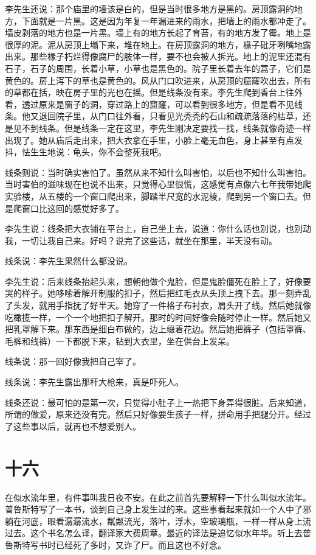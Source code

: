 李先生还说：那个庙里的墙该是白的，但是当时很多地方是黑的。房顶露洞的地方，下面就是一片黑。这是因为年复一年漏进来的雨水，把墙上的雨水都冲走了。墙皮剥落的地方也是一片黑。墙上有的地方长起了育苔，有的地方发了霉。地上是很厚的泥。泥从房顶上塌下来，堆在地上。在房顶露洞的地方，椽子砒牙咧嘴地露出来。那些椽子朽烂得像腐尸的肢体一样，要不也会被人拆光。地上的泥里还混有石子，石子的周围，长着小草，小草也是黑色的。院子里长着去年的蒿子，它们是黄色的。房上泻下的草也是黄色的。风从门口吹进来，从房顶的窟窿吹出去，所有的草都在括，映在房子里的光也在摇。但是线条没有来。李先生爬到香台上往外看，透过原来是窗子的洞，穿过路上的窟窿，可以看到很多地方，但是看不见线条。他又退回院子里，从门口往外看，只看见光秃秃的石山和疏疏落落的枯草，还是见不到线条。但是线条一定在这里，李先生刚决定要找一找，线条就像奇迹一样出现了。她从庙后走出来，把大衣拿在手里，小脸上毫无血色，身上甚至有点发抖，怯生生地说：龟头，你不会整死我吧。 

线条则说：当时确实害怕了。虽然从来不知什么叫害怕，以后也不知什么叫害怕。当时害伯的滋味现在也说不出来，只觉得心里很慌，这感觉有点像六七年我带她爬实验楼，从五楼的一个窗口爬出来，脚踏半尺宽的水泥棱，爬到另一个窗口去。但是爬窗口比这回的感觉好多了。 

李先生说：线条把大衣铺在平台上，自己坐上去，说道：你什么话也别说，也别动我，一切让我自己来。好吗？说完了这些话，就坐在那里，半天没有动。 

线条说：李先生果然什么都没说。 

李先生说：后来线条抬起头来，想朝他做个鬼脸，但是鬼脸僵死在脸上了，好像要哭的样子。她哆嗦着解开制服的扣子，然后把红毛衣从头顶上拽下去。那一刻弄乱了头发，就用手指抚了好半天。她穿了一件格子布衬衣，肩头开了线。然后她就像吃橄揽一样，一个一个地把扣子解开。那时的时间好像会随时停止一样。然后她又把乳罩解下来。那东西是细白布做的，边上缀着花边。然后她把裤子（包括罩裤、毛裤和线裤）一下都脱下来，钻到大衣里，坐在供台上发呆。 

线条说：那一回好像我把自己宰了。 

线条说：李先生露出那秆大枪来，真是吓死人。 

线条还说：最可怕的是第一次，只觉得小肚子上一热把下身弄得很脏。后来知道，所谓的做爱，原来还没有完。然后只好像要生孩子一样，拼命用手把腿分开。经过了这些事以后，就再也不想爱别人。

\section{十六}

在似水流年里，有件事叫我日夜不安。在此之前首先要解释一下什么叫似水流年。普鲁斯特写了一本书，谈到自己身上发生过的来。这些事看起来就如一个人中了邪躺在河底，眼看潺潺流水，粼粼流光，落叶，浮木，空玻璃瓶，一样一样从身上流过去。这个书名怎么译，翻译家大费周章。最近的译法是追忆似水年华。听上去普鲁斯特写书时已经死了多时，又诈了尸。而且这也不好念。 

